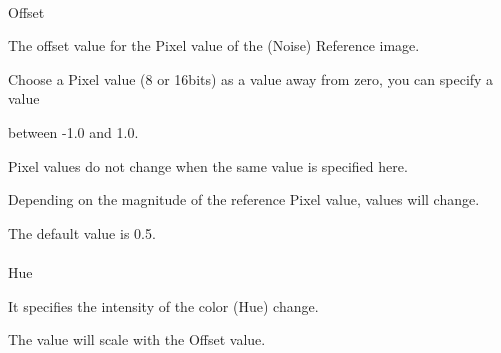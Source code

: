 \documentclass[a4paper,12pt]{article}
\begin{document}
\\
Offset\par
The offset value for the Pixel value of the (Noise) Reference image.\par
Choose a Pixel value (8 or 16bits) as a value away from zero, you can specify a value\par
between -1.0 and 1.0.\par
Pixel values do not change when the same value is specified here.\par
Depending on the magnitude of the reference Pixel value, values will change.\par
The default value is 0.5.\\
\\
Hue\par
It specifies the intensity of the color (Hue) change.\par
The value will scale with the Offset value.

\newpage

\thispagestyle{empty}
\end{document}
